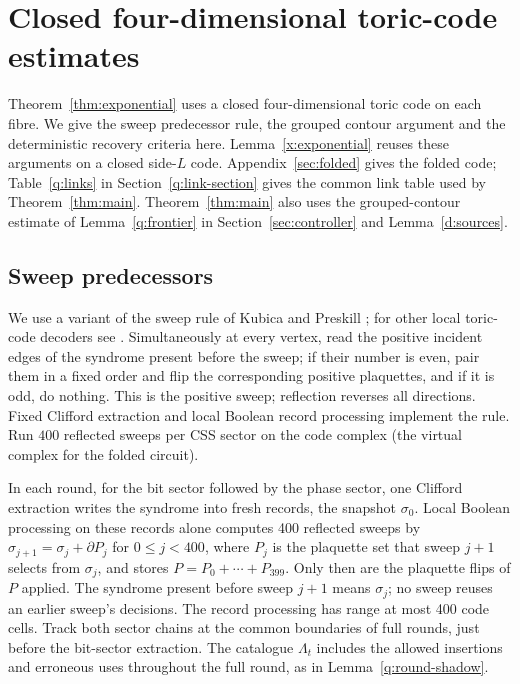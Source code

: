 \section{Closed four-dimensional toric-code estimates}\label{app:code-estimates}
Theorem~\ref{thm:exponential} uses a closed four-dimensional toric code on each fibre. We give the sweep predecessor rule, the grouped contour argument and the deterministic recovery criteria here. Lemma~\ref{x:exponential} reuses these arguments on a closed side-\(L\) code. Appendix~\ref{sec:folded} gives the folded code; Table~\ref{q:links} in Section~\ref{q:link-section} gives the common link table used by Theorem~\ref{thm:main}. Theorem~\ref{thm:main} also uses the grouped-contour estimate of Lemma~\ref{q:frontier} in Section~\ref{sec:controller} and Lemma~\ref{d:sources}.

\subsection{Sweep predecessors}

We use a variant of the sweep rule of Kubica and Preskill
\cite{KubicaPreskill2019}; for other local toric-code decoders see \cite{BDMT2017}. Simultaneously at every vertex, read the
positive incident edges of the syndrome present before the sweep; if
their number is even, pair them in a fixed order and flip the
corresponding positive plaquettes, and if it is odd, do nothing. This
is the positive sweep; reflection reverses all
directions. Fixed Clifford extraction and local Boolean record
processing implement the rule. Run \(400\) reflected sweeps per CSS
sector on the code complex (the virtual complex for the folded circuit).

In each round, for the bit sector followed by the phase sector, one
Clifford extraction writes the syndrome into fresh records, the snapshot
\(\sigma_0\). Local Boolean processing on these records alone computes
400 reflected sweeps by
\(\sigma_{j+1}=\sigma_j+\partial P_j\) for \(0\le j<400\), where
\(P_j\) is the plaquette set that sweep \(j+1\) selects from
\(\sigma_j\), and stores \(P=P_0+\cdots+P_{399}\). Only then are the
plaquette flips of \(P\) applied. The syndrome present before sweep
\(j+1\) means \(\sigma_j\); no sweep reuses an earlier sweep's decisions.
The record processing has range at most 400 code cells.
Track both sector chains at the common boundaries of full rounds,
just before the bit-sector extraction. The catalogue \(\Lambda_t\)
includes the allowed insertions and erroneous uses throughout the full
round, as in Lemma~\ref{q:round-shadow}.

